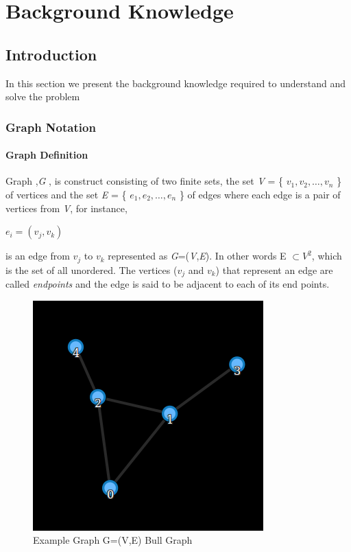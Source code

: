 \chapter{Background Knowledge}
\section{Introduction}
In this section we present the background knowledge required to understand and solve the problem
\subsection{Graph Notation}

\subsubsection{Graph Definition}
Graph ,\textit{G} , is construct consisting of two finite sets, the set \textit{V} = \{ $v_1,v_2, \ldots ,v_n$ \} of vertices and the set \textit{E} = \{ $e_1,e_2, \ldots,e_n$  \} of edges where each edge is a pair of vertices from \textit{V}, for instance,
\begin{center}
$e_i = (v_j,v_k)$
\end{center}
is an edge from $v_j$ to $v_k$ represented as \textit{G}=(\textit{V},\textit{E}). In other words  E $\subset V^2$, which is the set of all unordered. The vertices ($v_j$ and $v_k$) that represent an edge are called \textit{endpoints} and the edge is said to be adjacent to each of its end points.  \cite{PeterLinz}

\begin{figure}[h]
\caption{Example Graph G=(V,E) Bull Graph}
\includegraphics[scale=0.5]{bull.png}
\centering
\end{figure}

